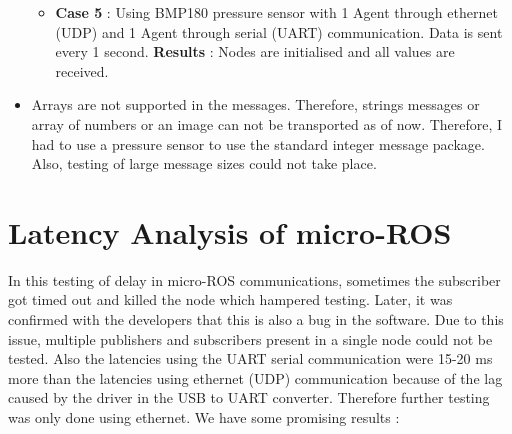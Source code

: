 \documentclass[%
xelatex,
	oneside,		%
	12pt,			%
	parskip=half,	%
	abstracton,
	chapterprefix=true%
    appendixprefix=true]
{scrbook}
\begin{document}
\begin{itemize}
\begin{itemize}
\item {\bfseries Case 5} : Using BMP180 pressure sensor with 1 Agent through ethernet (UDP) and 1 Agent through serial (UART) communication.
Data is sent every 1 second. \linebreak
{\bfseries Results} : Nodes are initialised and all values are received.
\end{itemize}
\item Arrays are not supported in the messages. Therefore, strings messages or array of numbers or an image can not be transported as of now. Therefore, I had to use a pressure sensor to use the standard integer message package. Also, testing of large message sizes could not take place.

\end{itemize}
\section{Latency Analysis of micro-ROS}
\vspace*{0.5cm}
In this testing of delay in micro-ROS communications, sometimes the subscriber got timed out and killed the node which hampered testing. Later, it was confirmed with the developers that this is also a bug in the software. Due to this issue, multiple publishers and subscribers present in a single node could not be tested. Also the latencies using the UART serial communication were 15-20 ms more than the latencies using ethernet (UDP) communication because of the lag caused by the driver in the USB to UART converter. Therefore further testing was only done using ethernet. We have some promising results :
\end{document}

